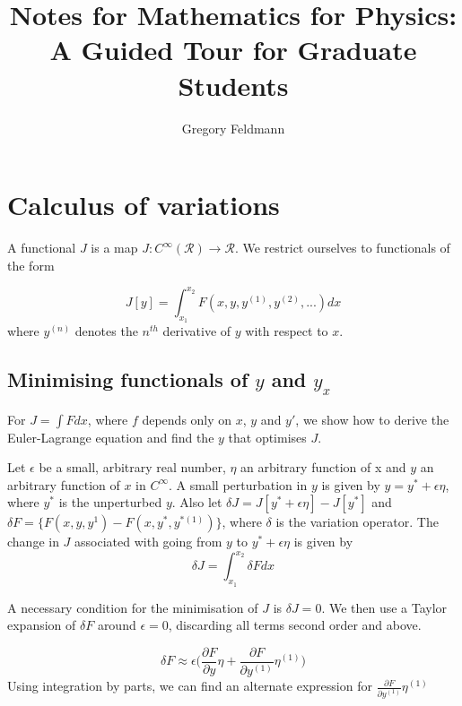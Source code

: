 \documentclass[]{article}
\title{Notes for Mathematics for Physics: A Guided Tour for Graduate Students}
\author{Gregory Feldmann}
\begin{document}
\maketitle

\tableofcontents
\newpage

\section{Calculus of variations}

A functional $J$ is a map $J:C^{\infty}(\mathcal{R}) \rightarrow \mathcal{R}$. We restrict ourselves to functionals of the form

\begin{equation} J[y] = \int_{x_{1}}^{x_{2}} F(x,y,y^{(1)},y^{(2)},...)dx \label{functional_def} \end{equation}
where $y^{(n)}$ denotes the $n^{th}$ derivative of $y$ with respect to $x$.

\subsection{Minimising functionals of $y$ and $y_{x}$}

For $J=\int Fdx$, where $f$ depends only on $x$, $y$ and $y'$, we show how to derive the Euler-Lagrange equation and find the $y$ that optimises $J$. 

Let $\epsilon$ be a small, arbitrary real number, $\eta$ an arbitrary function of x and $y$ an arbitrary function of $x$ in $C^{\infty}$. A small perturbation in $y$ is given by $y = y^{*} + \epsilon \eta$, where $y^{*}$ is the unperturbed $y$. Also let $\delta J = J[y^{*} + \epsilon \eta] - J[y^{*}] $ and $\delta  F = \{ F(x, y, y^{1})-F(x,y^{*},y^{*(1)}) \}$, where $\delta$ is the variation operator. The change in $J$ associated with going from $y$ to $y^{*} + \epsilon \eta$ is given by
\begin{equation} \delta J = \int_{x_{1}}^{x_{2}} \delta  F dx \label{variational_functional_example}\end{equation}

A necessary condition for the minimisation of $J$ is $\delta J= 0$. We then use a Taylor expansion of $\delta F$ around $\epsilon = 0$, discarding all terms second order and above.

\begin{equation} \delta F \approx \epsilon \bigg(\frac{\partial F}{\partial y} \eta+ \frac{\partial F}{\partial y^{(1)}}\eta^{(1)}\bigg) \label{taylor_expansion_example} \end{equation}
Using integration by parts, we can find an alternate expression for $\frac{\partial F}{\partial y^{(1)}}\eta^{(1)}$
\end{document}
